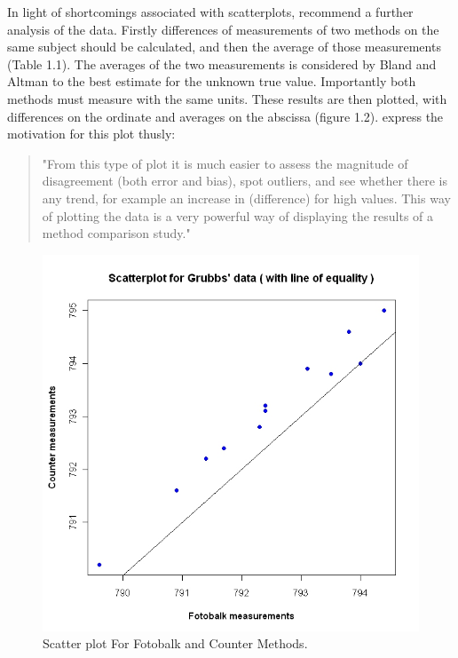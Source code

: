 \documentclass[Main.tex]{subfiles}
\begin{document}
	
	
	In light of shortcomings associated with scatterplots,
	\citet*{BA83} recommend a further analysis of the data. Firstly
	differences of measurements of two methods on the same subject
	should  be calculated, and then the average of those measurements
	(Table 1.1). The averages of the two measurements is considered by
	Bland and Altman to the best estimate for the unknown true value.
	Importantly both methods must measure with the same units. These
	results are then plotted, with differences on the ordinate and
	averages on the abscissa (figure 1.2). \citet*{BA83}express the
	motivation for this plot thusly:
	\begin{quote}
		"From this type of plot it is much easier to assess the magnitude
		of disagreement (both error and bias), spot outliers, and see
		whether there is any trend, for example an increase in
		(difference) for high values. This way of plotting the data is a
		very powerful way of displaying the results of a method comparison
		study."
	\end{quote}
		
	\begin{figure}[h!]
		\begin{center}
			\includegraphics[width=130mm]{images/GrubbsScatter.jpeg}
			\caption{Scatter plot For Fotobalk and Counter Methods.}\label{GrubbsScatter}
		\end{center}
	\end{figure}
	
\end{document}
